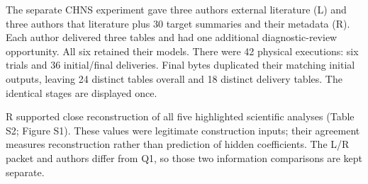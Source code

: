 \documentclass[11pt,letterpaper]{article}
\begin{document}
The separate CHNS experiment gave three authors external literature (L) and three authors that literature plus 30 target summaries and their metadata (R). Each author delivered three tables and had one additional diagnostic-review opportunity. All six retained their models. There were 42 physical executions: six trials and 36 initial/\allowbreak{}final deliveries. Final bytes duplicated their matching initial outputs, leaving 24 distinct tables overall and 18 distinct delivery tables. The identical stages are displayed once.


R supported close reconstruction of all five highlighted scientific analyses (Table S2; Figure S1). These values were legitimate construction inputs; their agreement measures reconstruction rather than prediction of hidden coefficients. The L/\allowbreak{}R packet and authors differ from Q1, so those two information comparisons are kept separate.


\begingroup

\small

\renewcommand{\arraystretch}{1.22}
\end{document}
